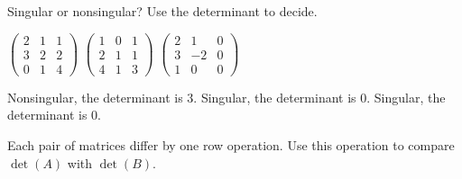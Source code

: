 \begin{exercises}
\begin{answer}
\begin{exparts}
       \end{exparts}  
     \end{answer}
  \item 
     Singular or nonsingular?
     Use the determinant to decide.
     \begin{exparts*}
       \partsitem \(
            \begin{pmatrix}
                2    &1   &1  \\
                3    &2   &2 \\
                0    &1   &4
            \end{pmatrix}    \)
       \partsitem \(
            \begin{pmatrix}
                1    &0   &1  \\
                2    &1   &1 \\
                4    &1   &3
            \end{pmatrix}    \)
       \partsitem \(
            \begin{pmatrix}
                2    &1   &0  \\
                3    &-2  &0 \\
                1    &0   &0
            \end{pmatrix}    \)
     \end{exparts*}
     \begin{answer}
      \begin{exparts}
         \partsitem Nonsingular, the determinant is \( 3 \).
         \partsitem Singular, the determinant is \( 0 \).
         \partsitem Singular, the determinant is \( 0 \).
       \end{exparts}  
     \end{answer}
  \recommended \item
    Each pair of matrices differ by one row operation.
    Use this operation to
    compare \( \det(A) \) with \( \det(B) \).
\end{exercises}
